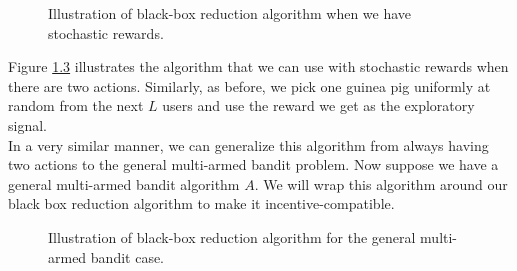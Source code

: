\documentclass[
  letterpaper,
  numbers=noenddot,
  DIV=11]{scrreprt}
\theoremstyle{definition}
\theoremstyle{plain}
\theoremstyle{plain}
\theoremstyle{remark}
\begin{document}
\begin{figure}


\caption{\label{fig-stochastic-guinea-pig}Illustration of black-box
reduction algorithm when we have stochastic rewards.}

\end{figure}%

Figure \hyperref[fig-stochastic-guinea-pig]{1.3} illustrates the
algorithm that we can use with stochastic rewards when there are two
actions. Similarly, as before, we pick one guinea pig uniformly at
random from the next \(L\) users and use the reward we get as the
exploratory signal.\\
In a very similar manner, we can generalize this algorithm from always
having two actions to the general multi-armed bandit problem. Now
suppose we have a general multi-armed bandit algorithm \(A\). We will
wrap this algorithm around our black box reduction algorithm to make it
incentive-compatible.

\begin{figure}


\caption{\label{fig-multi-armed-guinea-pig}Illustration of black-box
reduction algorithm for the general multi-armed bandit case.}

\end{figure}%
\end{document}
